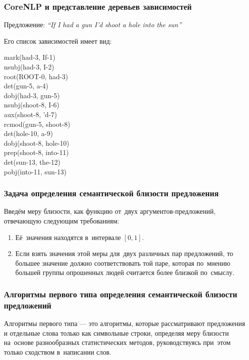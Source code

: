 \documentclass{beamer}
\begin{document}
\begin{frame}
\frametitle{CoreNLP и представление деревьев зависимостей}
Предложение: {\it ``If I had a gun I'd shoot a hole into the sun''}

Его список зависимостей имеет вид:

\begin{center}

mark(had-3, If-1)\\
nsubj(had-3, I-2)\\
root(ROOT-0, had-3)\\
det(gun-5, a-4)\\
dobj(had-3, gun-5)\\
nsubj(shoot-8, I-6)\\
aux(shoot-8, 'd-7)\\
rcmod(gun-5, shoot-8)\\
det(hole-10, a-9)\\
dobj(shoot-8, hole-10)\\
prep(shoot-8, into-11)\\
det(sun-13, the-12)\\
pobj(into-11, sun-13)\\

\end{center}

\end{frame}

\begin{frame}
\frametitle{Задача определения семантической близости предложения}

Введём меру близости, как функцию от~двух аргументов-предложений, отвечающую следующим требованиям:

\begin{enumerate}

\item {
Её~значения находятся в~интервале $[0,1]$.
}

\item {
Если взять значения этой меры для~двух различных пар предложений, 
то большее значение должно соответствовать той паре, которая по~мнению большей группы опрошенных людей считается более близкой по~смыслу.
}

\end{enumerate}
\end{frame}

\begin{frame}
\frametitle{Алгоритмы первого типа определения семантической близости предложений}

Алгоритмы первого типа --- это алгоритмы, которые рассматривают предложения и отдельные слова только как символьные строки, 
определяя меру близости на~основе разнообразных статистических методов, 
руководствуясь при~этом только сходством в~написании слов.

\end{frame}
\end{document}
